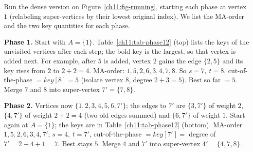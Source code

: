Run the dense version on Figure~\ref{ch11:fig-running}, starting each phase at vertex $1$ (relabeling super-vertices by their lowest original index). We list the MA-order and the two key quantities for each phase.

\textbf{Phase 1.} Start with $A=\{1\}$. Table~\ref{ch11:tab-phase12} (top) lists the keys of the unvisited vertices after each step; the bold key is the largest, so that vertex is added next. For example, after $5$ is added, vertex $2$ gains the edge $\{2,5\}$ and its key rises from $2$ to $2+2=4$.
MA-order: $1,5,2,6,3,4,7,8$. So $s=7,\ t=8$, cut-of-the-phase $=\textit{key}[8]=5$ (isolate vertex $8$, degree $2+3=5$). Best so far $=5$. Merge $7$ and $8$ into super-vertex $7'=\{7,8\}$.

\textbf{Phase 2.} Vertices now $\{1,2,3,4,5,6,7'\}$; the edges to $7'$ are $\{3,7'\}$ of weight $2$, $\{4,7'\}$ of weight $2+2=4$ (two old edges summed) and $\{6,7'\}$ of weight $1$. Start again at $A=\{1\}$; the keys are in Table~\ref{ch11:tab-phase12} (bottom). MA-order $1,5,2,6,3,4,7'$; $s=4,\ t=7'$, cut-of-the-phase $=\textit{key}[7']=$ degree of $7'=2+4+1=7$. Best stays $5$. Merge $4$ and $7'$ into super-vertex $4'=\{4,7,8\}$.

